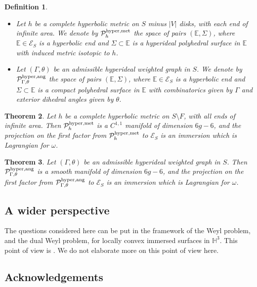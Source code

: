 \documentclass[notitlepage,twoside,a4paper]{amsart}
\newcommand{\Phyang}{\cP^{\rm hyper,ang}_{\Gamma,\theta}}
\newcommand{\Phymet}{\cP^{\rm hyper,met}_{h}}
\newtheorem{theorem}{\rm\bf Theorem}[section]
\newtheorem{definition}[theorem]{\rm\bf Definition}
\theoremstyle{named}
\newcommand{\HH}{{\mathbb H}}
\newcommand{\bE}{{\mathbb E}}
\newcommand{\cE}{{\mathcal E}}
\newcommand{\cP}{{\mathcal P}}
\begin{document}
\begin{definition}
  \begin{itemize}
  \item Let $h$ be a complete hyperbolic metric on $S$ minus $|V|$ disks, with each end of infinite area.  We denote by $\Phymet$ the space of pairs $(\bE,\Sigma)$, where $\bE\in \cE_S$ is a hyperbolic end and $\Sigma\subset \bE$ is a hyperideal polyhedral surface in $\bE$ with induced metric isotopic to $h$.
  \item Let $(\Gamma, \theta)$ be an admissible hyperideal weighted graph in $S$. We denote by $\Phyang$ the space of pairs $(\bE,\Sigma)$, where $\bE\in \cE_S$ is a hyperbolic end and $\Sigma\subset \bE$ is a compact polyhedral surface in $\bE$ with combinatorics given by $\Gamma$ and exterior dihedral angles given by $\theta$.
  \end{itemize}
\end{definition}

\begin{theorem} \label{tm:hyperideal}
    Let $h$ be a complete hyperbolic metric on $S\setminus F$, with all ends of infinite area. Then $\Phymet$ is a $C^{1,1}$ manifold of dimension $6g-6$, and the projection on the first factor from $\Phymet$ to $\cE_S$ is an immersion which is Lagrangian for $\omega$.
\end{theorem}

\begin{theorem} \label{tm:hyperideal*}
  Let $(\Gamma, \theta)$ be an admissible hyperideal weighted graph in $S$. Then $\Phyang$ is a smooth manifold of dimension $6g-6$, and the projection on the first factor from $\Phyang$ to $\cE_S$ is an immersion which is Lagrangian for $\omega$.
\end{theorem}

\subsection{A wider perspective}
\label{ssc:perspective}

The questions considered here can be put in the framework of the Weyl problem, and the dual Weyl problem, for locally convex immersed surfaces in $\HH^3$. This point of view is \cite[Section 5]{weylsurvey}. We do not elaborate more on this point of view here.

\subsection{Acknowledgements}
\end{document}
